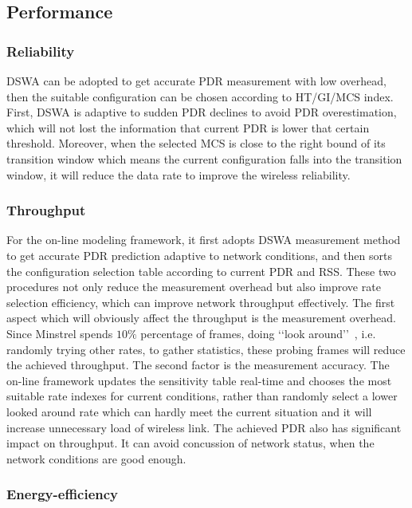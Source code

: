 \documentclass[draftclsnofoot,journal,onecolumn,11pt]{IEEEtran}
\begin{document}
\subsection{Performance}

\subsubsection{Reliability}

DSWA can be adopted to get accurate PDR measurement with low overhead, then the suitable configuration can be chosen according to HT/GI/MCS index. First, DSWA is adaptive to sudden PDR declines to avoid PDR overestimation, which will not lost the information that current PDR is lower that certain threshold. Moreover, when the selected MCS is close to the right bound of its transition window which means the current configuration falls into the transition window, it will reduce the data rate to improve the wireless reliability.

\subsubsection{Throughput}

For the on-line modeling framework, it first adopts DSWA measurement method to get accurate PDR prediction adaptive to network conditions, and then sorts the configuration selection table according to current PDR and RSS. These two procedures not only reduce the measurement overhead but also improve rate selection efficiency, which can improve network throughput effectively. The first aspect which will obviously affect the throughput is the measurement overhead. Since Minstrel spends $10\%$ percentage of frames, doing \lq\lq look around\rq\rq~, i.e. randomly trying other rates, to gather statistics, these probing frames will reduce the achieved throughput. The second factor is the measurement accuracy. The on-line framework updates the sensitivity table real-time and chooses the most suitable rate indexes for current conditions, rather than randomly select a lower looked around rate which can hardly meet the current situation and it will increase unnecessary load of wireless link. The achieved PDR also has significant impact on throughput. It can avoid concussion of network status, when the network conditions are good enough.


\subsubsection{Energy-efficiency}



\renewcommand\refname{References}
%


\end{document}
